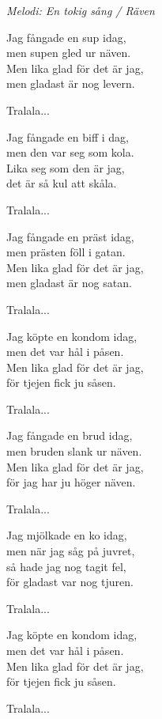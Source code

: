 {\footnotesize\textit{Melodi: En tokig sång / Räven}}\par
\vspace{10pt}
Jag fångade en sup idag,\\
men supen gled ur näven.\\
Men lika glad för det är jag,\\
men gladast är nog levern.\par
\vspace{10pt}
Tralala...\par
\vspace{10pt}
Jag fångade en biff i dag,\\
men den var seg som kola.\\
Lika seg som den är jag,\\
det är så kul att skåla.\par
\vspace{10pt}
Tralala...\par
\vspace{10pt}
Jag fångade en präst idag,\\
men prästen föll i gatan.\\
Men lika glad för det är jag,\\
men gladast är nog satan.\par
\vspace{10pt}
Tralala...\par
\vspace{10pt}
Jag köpte en kondom idag,\\
men det var hål i påsen.\\
Men lika glad för det är jag,\\
för tjejen fick ju såsen.\par
\vspace{10pt}
Tralala...\par
\newpage
Jag fångade en brud idag,\\
men bruden slank ur näven.\\
Men lika glad för det är jag,\\
för jag har ju höger näven.\par
\vspace{10pt}
Tralala...\par
\vspace{10pt}
Jag mjölkade en ko idag,\\
men när jag såg på juvret,\\
så hade jag nog tagit fel,\\
för gladast var nog tjuren.\par
\vspace{10pt}
Tralala...\par
\vspace{10pt}
Jag köpte en kondom idag,\\
men det var hål i påsen.\\
Men lika glad för det är jag,\\
för tjejen fick ju såsen.\par
\vspace{10pt}
Tralala...
